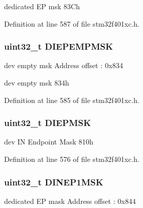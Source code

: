 dedicated EP msk 83\+Ch 

Definition at line 587 of file stm32f401xc.\+h.

\subsubsection[{\texorpdfstring{D\+I\+E\+P\+E\+M\+P\+M\+SK}{DIEPEMPMSK}}]{ uint32\+\_\+t D\+I\+E\+P\+E\+M\+P\+M\+SK}\hypertarget{struct_u_s_b___o_t_g___device_type_def_a99c6c50a3e3235c81b98a428ebd33d4c}{}\label{struct_u_s_b___o_t_g___device_type_def_a99c6c50a3e3235c81b98a428ebd33d4c}
dev empty msk Address offset \+: 0x834

dev empty msk 834h 

Definition at line 585 of file stm32f401xc.\+h.

\subsubsection[{\texorpdfstring{D\+I\+E\+P\+M\+SK}{DIEPMSK}}]{ uint32\+\_\+t D\+I\+E\+P\+M\+SK}\hypertarget{struct_u_s_b___o_t_g___device_type_def_a48647281e48d96a96f701cf5ae3f4f63}{}\label{struct_u_s_b___o_t_g___device_type_def_a48647281e48d96a96f701cf5ae3f4f63}
dev IN Endpoint Mask 810h 

Definition at line 576 of file stm32f401xc.\+h.

\subsubsection[{\texorpdfstring{D\+I\+N\+E\+P1\+M\+SK}{DINEP1MSK}}]{ uint32\+\_\+t D\+I\+N\+E\+P1\+M\+SK}\hypertarget{struct_u_s_b___o_t_g___device_type_def_ab62b876c61e11199cf5c37aa944a5fed}{}\label{struct_u_s_b___o_t_g___device_type_def_ab62b876c61e11199cf5c37aa944a5fed}
dedicated EP mask Address offset \+: 0x844

